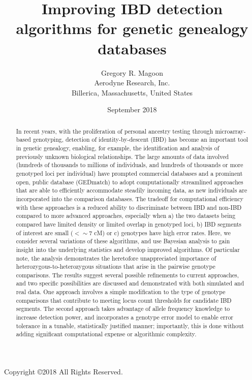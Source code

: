 \documentclass{article}
\title{Improving IBD detection algorithms for genetic genealogy databases}
\author{Gregory R. Magoon\\Aerodyne Research, Inc.\\Billerica, Massachusetts, United States}
\date{September 2018}
\begin{document}
\maketitle
\begin{center}
Copyright \copyright 2018 All Rights Reserved.
\end{center}

\begin{abstract}
    In recent years, with the proliferation of personal ancestry testing through microarray-based genotyping, detection of identity-by-descent (IBD) has become an important tool in genetic genealogy, enabling, for example, the identification and analysis of previously unknown biological relationships. The large amounts of data involved (hundreds of thousands to millions of individuals, and hundreds of thousands or more genotyped loci per individual) have prompted commercial databases and a prominent open, public database (GEDmatch) to adopt computationally streamlined approaches that are able to efficiently accommodate steadily incoming data, as new individuals are incorporated into the comparison databases. The tradeoff for computational efficiency with these approaches is a reduced ability to discriminate between IBD and non-IBD compared to more advanced approaches, especially when a) the two datasets being compared have limited density or limited overlap in genotyped loci, b) IBD segments of interest are small ($<\sim$7 cM) or c) genotypes have high error rates. Here, we consider several variations of these algorithms, and use Bayesian analysis to gain insight into the underlying statistics and develop improved algorithms. Of particular note, the analysis demonstrates the heretofore unappreciated importance of heterozygous-to-heterozygous situations that arise in the pairwise genotype comparisons. The results suggest several possible refinements to current approaches, and two specific possibilities are discussed and demonstrated with both simulated and real data. One approach involves a simple modification to the type of genotype comparisons that contribute to meeting locus count thresholds for candidate IBD segments. The second approach takes advantage of allele frequency knowledge to increase detection power, and incorporates a genotype error model to enable error tolerance in a tunable, statistically justified manner; importantly, this is done without adding significant computational expense or algorithmic complexity.
\end{abstract}
\end{document}
